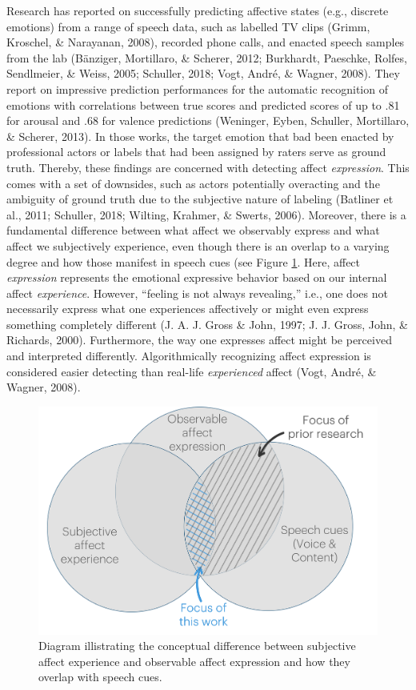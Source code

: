 \documentclass[
  english,
  man,floatsintext]{apa6}
\begin{document}
Research has reported on successfully predicting affective states (e.g., discrete emotions) from a range of speech data, such as labelled TV clips (Grimm, Kroschel, \& Narayanan, 2008), recorded phone calls, and enacted speech samples from the lab (Bänziger, Mortillaro, \& Scherer, 2012; Burkhardt, Paeschke, Rolfes, Sendlmeier, \& Weiss, 2005; Schuller, 2018; Vogt, André, \& Wagner, 2008). They report on impressive prediction performances for the automatic recognition of emotions with correlations between true scores and predicted scores of up to .81 for arousal and .68 for valence predictions (Weninger, Eyben, Schuller, Mortillaro, \& Scherer, 2013). In those works, the target emotion that bad been enacted by professional actors or labels that had been assigned by raters serve as ground truth. Thereby, these findings are concerned with detecting affect \emph{expression}. This comes with a set of downsides, such as actors potentially overacting and the ambiguity of ground truth due to the subjective nature of labeling (Batliner et al., 2011; Schuller, 2018; Wilting, Krahmer, \& Swerts, 2006). Moreover, there is a fundamental difference between what affect we observably express and what affect we subjectively experience, even though there is an overlap to a varying degree and how those manifest in speech cues (see Figure \ref{fig:experiencevsexpression}. Here, affect \emph{expression} represents the emotional expressive behavior based on our internal affect \emph{experience}. However, ``feeling is not always revealing,'' i.e., one does not necessarily express what one experiences affectively or might even express something completely different (J. A. J. Gross \& John, 1997; J. J. Gross, John, \& Richards, 2000). Furthermore, the way one expresses affect might be perceived and interpreted differently. Algorithmically recognizing affect expression is considered easier detecting than real-life \emph{experienced} affect (Vogt, André, \& Wagner, 2008).

\begin{figure}

{\centering \includegraphics[width=0.75\linewidth]{../figures/experience_vs_expression} 

}

\caption[Experience versus expression]{Diagram illistrating the conceptual difference between subjective affect experience and observable affect expression and how they overlap with speech cues.}\label{fig:experiencevsexpression}
\end{figure}
\end{document}
